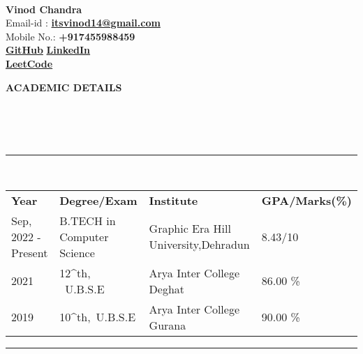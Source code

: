 \documentclass[a4paper,10pt]{article}
\newcommand{\lsep}{-0.5cm}
\newcommand{\resheading}[1]{{\small \colorbox{mygrey}{\begin{minipage}{0.975\textwidth}{\textbf{#1 \vphantom{p\^{E}}}}\end{minipage}}}}
\begin{document}
\hspace{0.5cm}\\[-0.2cm]

\textbf{Vinod Chandra} \\
\indent Email-id : \textbf{\url{itsvinod14@gmail.com}} \\
\indent Mobile No.: \textbf{+917455988459} \ \\
\indent \textbf{\href{https://github.com/VinodPandey14}{GitHub}} 
\indent \textbf{\href{https://www.linkedin.com/in/vinod-pandey14/}{LinkedIn}}\\
\indent \textbf{\href{https://leetcode.com/u/Vinod-Pandey/}{LeetCode}}\\

\resheading{\textbf{ACADEMIC DETAILS} }\\[\lsep]
\\
\\
\indent \rule{6.8in}{0.4pt}\\
\indent \begin{tabular}{ l @{\hskip 0.15in} l @{\hskip 0.15in} l @{\hskip 0.15in} l @{\hskip 0.15in} }
\noindent \textbf{Year} & \textbf{Degree/Exam} & \textbf{Institute} & \textbf{GPA/Marks(\%)}\\
Sep, 2022 - Present & B.TECH in Computer Science & Graphic Era Hill University,Dehradun & 8.43/10\\
2021 & 12^{th}, \ U.B.S.E & Arya Inter College Deghat & 86.00 \% \\
2019 & 10^{th},\ U.B.S.E & Arya Inter College Gurana & 90.00 \%\\

\end{tabular}
\indent \rule{6.8in}{0.4pt}
\\
\end{document}
